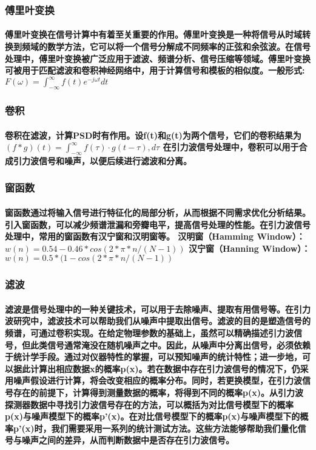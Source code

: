 \documentclass{article}
\begin{document}
\subsubsection{傅里叶变换}
\paragraph{傅里叶变换在信号计算中有着至关重要的作用。傅里叶变换是一种将信号从时域转换到频域的数学方法，它可以将一个信号分解成不同频率的正弦和余弦波。在信号处理中，傅里叶变换被广泛应用于滤波、频谱分析、信号压缩等领域。傅里叶变换可被用于匹配滤波和卷积神经网络中，用于计算信号和模板的相似度。一般形式: 
$F(\omega) = \int_{-\infty}^{\infty}f(t)e^{-j\omega t}dt$}
\subsubsection{卷积}
\paragraph{卷积在滤波，计算PSD时有作用。设f(t)和g(t)为两个信号，它们的卷积结果为$(f * g)(t) = \int_{-\infty}^{\infty} f(\tau) \cdot g(t - \tau) , d\tau$
在引力波信号处理中，卷积可以用于合成引力波信号和噪声，以便后续进行滤波和分离。}
\subsubsection{窗函数}
\paragraph{窗函数通过将输入信号进行特征化的局部分析，从而根据不同需求优化分析结果。引入窗函数，可以减少频谱泄漏和旁瓣电平，提高信号处理的性能。在引力波信号处理中，常用的窗函数有汉宁窗和汉明窗等。
汉明窗（Hamming Window）：$w(n) = 0.54 - 0.46 * cos(2 * π * n / (N - 1))$
汉宁窗（Hanning Window）：$w(n) = 0.5 * (1 - cos(2 * π * n / (N - 1))$}

\subsubsection{滤波}
\paragraph{滤波是信号处理中的一种关键技术，可以用于去除噪声、提取有用信号等。在引力波研究中，滤波技术可以帮助我们从噪声中提取出信号。滤波的目的是塑造信号的频谱，可通过卷积实现。在给定物理参数的基础上，虽然可以精确描述引力波信号，但此类信号通常淹没在随机噪声之中。\textbf{因此，从噪声中分离出信号，必须依赖于统计学手段。}通过对仪器特性的掌握，可以预知噪声的统计特性；进一步地，可以据此计算出相应数据x的概率p(x)。若在数据中存在引力波信号的情况下，仍采用噪声假设进行计算，将会改变相应的概率分布。同时，若更换模型，在引力波信号存在的前提下，计算得到测量数据的概率，将得到不同的概率p(x)。从引力波探测器数据中寻找引力波信号存在的方法，可以概括为对比信号模型下的概率p(x)与噪声模型下的概率p'(x)。在对比信号模型下的概率p(x)与噪声模型下的概率p'(x)时，我们需要采用一系列的统计测试方法。这些方法能够帮助我们量化信号与噪声之间的差异，从而判断数据中是否存在引力波信号。}
\end{document}
